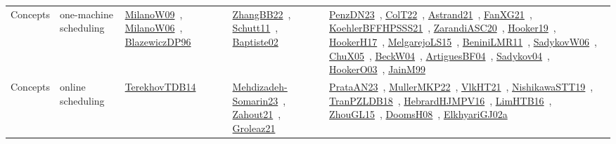 {\begin{longtable}{lp{3cm}>{\raggedright\arraybackslash}p{6cm}>{\raggedright\arraybackslash}p{6cm}>{\raggedright\arraybackslash}p{8cm}}
Concepts & one-machine scheduling & \href{../works/MilanoW09.pdf}{MilanoW09}~\cite{MilanoW09}, \href{../works/MilanoW06.pdf}{MilanoW06}~\cite{MilanoW06}, \href{../works/BlazewiczDP96.pdf}{BlazewiczDP96}~\cite{BlazewiczDP96} & \href{../works/ZhangBB22.pdf}{ZhangBB22}~\cite{ZhangBB22}, \href{../works/Schutt11.pdf}{Schutt11}~\cite{Schutt11}, \href{../works/Baptiste02.pdf}{Baptiste02}~\cite{Baptiste02} & \href{../works/PenzDN23.pdf}{PenzDN23}~\cite{PenzDN23}, \href{../works/ColT22.pdf}{ColT22}~\cite{ColT22}, \href{../works/Astrand21.pdf}{Astrand21}~\cite{Astrand21}, \href{../works/FanXG21.pdf}{FanXG21}~\cite{FanXG21}, \href{../works/KoehlerBFFHPSSS21.pdf}{KoehlerBFFHPSSS21}~\cite{KoehlerBFFHPSSS21}, \href{../works/ZarandiASC20.pdf}{ZarandiASC20}~\cite{ZarandiASC20}, \href{../works/Hooker19.pdf}{Hooker19}~\cite{Hooker19}, \href{../works/HookerH17.pdf}{HookerH17}~\cite{HookerH17}, \href{../works/MelgarejoLS15.pdf}{MelgarejoLS15}~\cite{MelgarejoLS15}, \href{../works/BeniniLMR11.pdf}{BeniniLMR11}~\cite{BeniniLMR11}, \href{../works/SadykovW06.pdf}{SadykovW06}~\cite{SadykovW06}, \href{../works/ChuX05.pdf}{ChuX05}~\cite{ChuX05}, \href{../works/BeckW04.pdf}{BeckW04}~\cite{BeckW04}, \href{../works/ArtiguesBF04.pdf}{ArtiguesBF04}~\cite{ArtiguesBF04}, \href{../works/Sadykov04.pdf}{Sadykov04}~\cite{Sadykov04}, \href{../works/HookerO03.pdf}{HookerO03}~\cite{HookerO03}, \href{../works/JainM99.pdf}{JainM99}~\cite{JainM99}\\
Concepts & online scheduling & \href{../works/TerekhovTDB14.pdf}{TerekhovTDB14}~\cite{TerekhovTDB14} & \href{../works/Mehdizadeh-Somarin23.pdf}{Mehdizadeh-Somarin23}~\cite{Mehdizadeh-Somarin23}, \href{../works/Zahout21.pdf}{Zahout21}~\cite{Zahout21}, \href{../works/Groleaz21.pdf}{Groleaz21}~\cite{Groleaz21} & \href{../works/PrataAN23.pdf}{PrataAN23}~\cite{PrataAN23}, \href{../works/MullerMKP22.pdf}{MullerMKP22}~\cite{MullerMKP22}, \href{../works/VlkHT21.pdf}{VlkHT21}~\cite{VlkHT21}, \href{../works/NishikawaSTT19.pdf}{NishikawaSTT19}~\cite{NishikawaSTT19}, \href{../works/TranPZLDB18.pdf}{TranPZLDB18}~\cite{TranPZLDB18}, \href{../works/HebrardHJMPV16.pdf}{HebrardHJMPV16}~\cite{HebrardHJMPV16}, \href{../works/LimHTB16.pdf}{LimHTB16}~\cite{LimHTB16}, \href{../works/ZhouGL15.pdf}{ZhouGL15}~\cite{ZhouGL15}, \href{../works/DoomsH08.pdf}{DoomsH08}~\cite{DoomsH08}, \href{../works/ElkhyariGJ02a.pdf}{ElkhyariGJ02a}~\cite{ElkhyariGJ02a}\\

\end{longtable}}
